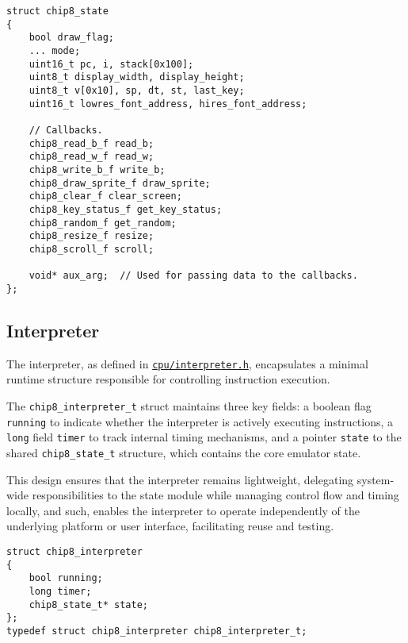 \begin{verbatim}
struct chip8_state
{
    bool draw_flag;
    ... mode;
    uint16_t pc, i, stack[0x100];
    uint8_t display_width, display_height;
    uint8_t v[0x10], sp, dt, st, last_key;
    uint16_t lowres_font_address, hires_font_address;
    
    // Callbacks.
    chip8_read_b_f read_b;
    chip8_read_w_f read_w;
    chip8_write_b_f write_b;
    chip8_draw_sprite_f draw_sprite;
    chip8_clear_f clear_screen;
    chip8_key_status_f get_key_status;
    chip8_random_f get_random;
    chip8_resize_f resize;
    chip8_scroll_f scroll;
    
    void* aux_arg;  // Used for passing data to the callbacks.
};
\end{verbatim}

\subsection{Interpreter}
\label{subsec:ch3sec3sub1}

\par The interpreter, as defined in \href{https://github.com/solomonarul/cchip8/blob/main/inc/cchip8/cpu/interpreter.h}{\texttt{cpu/interpreter.h}}, encapsulates a minimal runtime structure responsible for controlling instruction execution.

\par The \texttt{chip8\_interpreter\_t} struct maintains three key fields: a boolean flag \texttt{running} to indicate whether the interpreter is actively executing instructions, a \texttt{long} field \texttt{timer} to track internal timing mechanisms, and a pointer \texttt{state} to the shared \texttt{chip8\_state\_t} structure, which contains the core emulator state.

\par This design ensures that the interpreter remains lightweight, delegating system-wide responsibilities to the state module while managing control flow and timing locally, and such, enables the interpreter to operate independently of the underlying platform or user interface, facilitating reuse and testing.

\begin{verbatim}
struct chip8_interpreter
{
    bool running;
    long timer;
    chip8_state_t* state;
};
typedef struct chip8_interpreter chip8_interpreter_t;
\end{verbatim}

